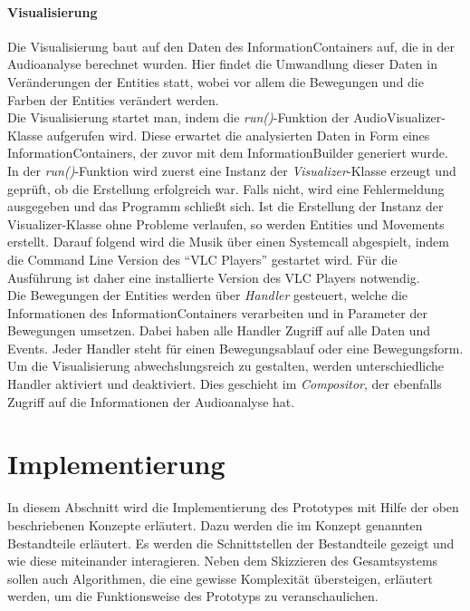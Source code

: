 \documentclass[11pt,a4paper]{article}
\begin{document}
\paragraph{Visualisierung}
Die Visualisierung baut auf den Daten des InformationContainers auf, die in der Audioanalyse berechnet wurden. Hier findet die Umwandlung dieser Daten in Veränderungen der Entities statt, wobei vor allem die Bewegungen und die Farben der Entities verändert werden.\\
Die Visualisierung startet man, indem die \textit{run()}-Funktion der AudioVisualizer-Klasse aufgerufen wird. Diese erwartet die analysierten Daten in Form eines InformationContainers, der zuvor mit dem InformationBuilder generiert wurde. In der \textit{run()}-Funktion wird zuerst eine Instanz der \textit{Visualizer}-Klasse erzeugt und geprüft, ob die Erstellung erfolgreich war. Falls nicht, wird eine Fehlermeldung ausgegeben und das Programm schließt sich. Ist die Erstellung der Instanz der Visualizer-Klasse ohne Probleme verlaufen, so werden Entities und Movements erstellt. Darauf folgend wird die Musik über einen Systemcall abgespielt, indem die Command Line Version des ``VLC Players'' gestartet wird. Für die Ausführung ist daher eine installierte Version des VLC Players notwendig.\\
Die Bewegungen der Entities werden über \textit{Handler} gesteuert, welche die Informationen des InformationContainers verarbeiten und in Parameter der Bewegungen umsetzen. Dabei haben alle Handler Zugriff auf alle Daten und Events. Jeder Handler steht für einen Bewegungsablauf oder eine Bewegungsform. Um die Visualisierung abwechslungsreich zu gestalten, werden unterschiedliche Handler aktiviert und deaktiviert. Dies geschieht im \textit{Compositor}, der ebenfalls Zugriff auf die Informationen der Audioanalyse hat.

\newpage
\section{Implementierung}
In diesem Abschnitt wird die Implementierung des Prototypes mit Hilfe der oben beschriebenen Konzepte erläutert. Dazu werden die im Konzept genannten Bestandteile erläutert. Es werden die Schnittstellen der Bestandteile gezeigt und wie diese miteinander interagieren. Neben dem Skizzieren des Gesamtsystems sollen auch Algorithmen, die eine gewisse Komplexität übersteigen, erläutert werden, um die Funktionsweise des Prototyps zu veranschaulichen.
\end{document}
